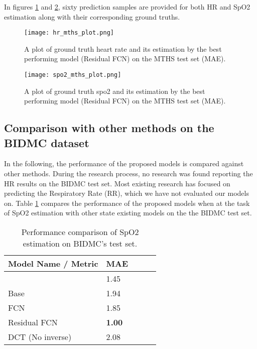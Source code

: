 \documentclass[conference]{IEEEtran}
\begin{document}
In figures \ref{fig:MTHS-pred-hr} and \ref{fig:MTHS-pred-spo2}, sixty prediction samples are provided for both HR and SpO2 estimation along with their corresponding ground truths.

\begin{figure}[htbp]
    \centering
    \texttt{[image: hr\_mths\_plot.png]}
    \caption{A plot of ground truth heart rate and its estimation by the best performing model (Residual FCN) on the MTHS test set (MAE).}
    \label{fig:MTHS-pred-hr}
\end{figure}

\begin{figure}[htbp]
    \centering
    \texttt{[image: spo2\_mths\_plot.png]}
    \caption{A plot of ground truth spo2 and its estimation by the best performing model (Residual FCN) on the MTHS test set (MAE).}
    \label{fig:MTHS-pred-spo2}
\end{figure}

\subsection{Comparison with other methods on the BIDMC dataset}
In the following, the performance of the proposed models is compared against other methods. During the research process, no research was found reporting the HR results on the BIDMC test set. Most existing research has focused on predicting the Respiratory Rate (RR), which we have not evaluated our models on. Table \ref{table:BIDMC_comparison_spo2} compares the performance of the proposed models when at the task of SpO2 estimation with other state existing models on the the BIDMC test set.

\begin{table}[htbp]
\centering
\caption{Performance comparison of SpO2 estimation on BIDMC's test set.}
\label{table:BIDMC_comparison_spo2}
\begin{tabular}{lllll}
\toprule
Model Name / Metric & MAE \\ \hline
\cite{b16}               & 1.45     \\
Base                     & 1.94     \\
FCN                      & 1.85     \\
Residual FCN            & \textbf{1.00}     \\
DCT (No inverse)        & 2.08    \\
\bottomrule
\end{tabular}
\end{table}
\end{document}
